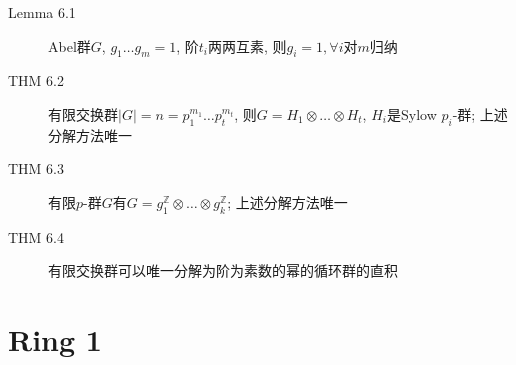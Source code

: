 \documentclass{article}
\renewcommand{\l}{\left}
\renewcommand{\r}{\right}
\begin{document}
\begin{description}
        \item[Lemma 6.1] Abel群$G$, $g_1 \dots g_m = 1$, 阶$t_i$两两互素, 则$g_i = 1, \forall i$\hfill 对$m$归纳
        \item[THM 6.2] 有限交换群$\l|G\r| = n = p_1^{m_1} \dots p_t^{m_t}$, 则$G = H_1 \otimes \dots \otimes H_t$, $H_i$是Sylow $p_i$-群; 上述分解方法唯一
        \item[THM 6.3] 有限$p$-群$G$有$G = g_1^\mathbb Z \otimes \dots \otimes g_k^\mathbb Z$; 上述分解方法唯一
        \item[THM 6.4] 有限交换群可以唯一分解为阶为素数的幂的循环群的直积
    \end{description}

    \section{Ring 1}
\end{document}
